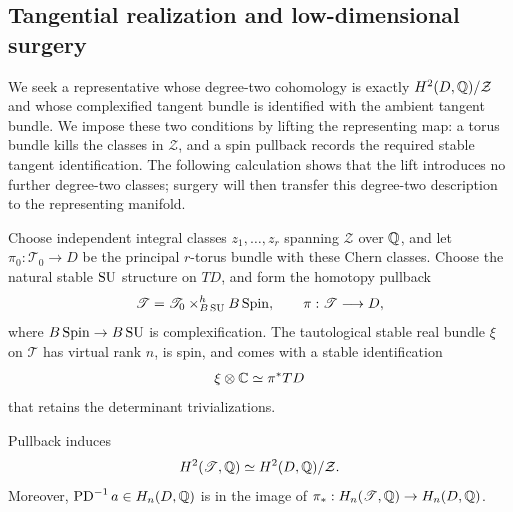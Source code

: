 \subsection{Tangential realization and low-dimensional surgery}

We seek a representative whose degree-two cohomology is exactly
$H^2(D,\mathbb Q)/\mathcal Z$ and whose complexified tangent bundle is
identified with the ambient tangent bundle.  We impose these two
conditions by lifting the representing map: a torus bundle kills
the classes in $\mathcal Z$, and a spin pullback records the required
stable tangent identification.  The following calculation shows that
the lift introduces no further degree-two classes; surgery will then
transfer this degree-two description to the representing manifold.

Choose independent integral classes $z_1,\ldots,z_r$ spanning
$\mathcal Z$ over $\mathbb Q$, and let
$\pi_0:\mathscr T_0\to D$ be the principal $r$-torus bundle with these
Chern classes.  Choose the natural stable $\operatorname{SU}$ structure on $TD$, and
form the homotopy pullback
\[
 \mathscr T=\mathscr T_0\times^{h}_{B\operatorname{SU}}B\operatorname{Spin},
 \qquad \pi:\mathscr T\longrightarrow D,
\]
where $B\operatorname{Spin}\to B\operatorname{SU}$ is complexification.  The tautological stable
real bundle $\xi$ on $\mathscr T$ has virtual rank $n$, is spin, and
comes with a stable identification
\begin{equation}\label{topo:tautological}
 \xi\otimes\mathbb C\simeq\pi^*TD
\end{equation}
that retains the determinant trivializations.

\begin{lemma}\label{topo:lift}
Pullback induces
\[
 H^2(\mathscr T,\mathbb Q)\simeq H^2(D,\mathbb Q)/\mathcal Z.
\]
Moreover, $\operatorname{PD}^{-1}a\in H_n(D,\mathbb Q)$ is in the image of
$\pi_*:H_n(\mathscr T,\mathbb Q)\to H_n(D,\mathbb Q)$.
\end{lemma}

